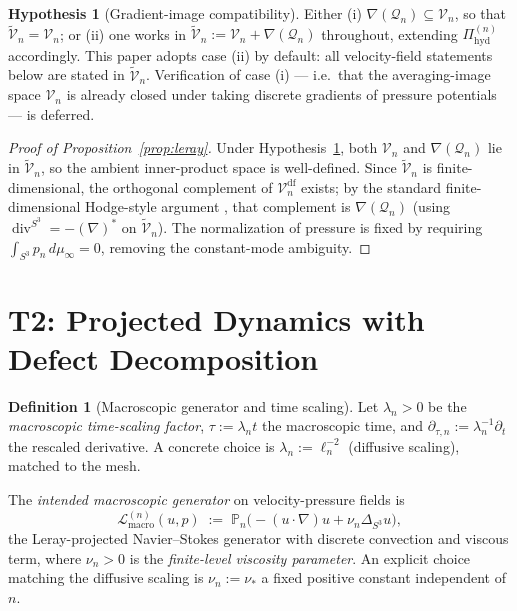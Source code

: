 \documentclass[11pt, a4paper]{amsart}
\theoremstyle{definition}
\newtheorem{definition}[theorem]{Definition}
\newtheorem{hypothesis}[theorem]{Hypothesis}
\newcommand{\Pihyd}{\Pi_{\mathrm{hyd}}}
\newcommand{\Lmacro}{\mathcal L_{\mathrm{macro}}}
\newcommand{\divS}{\operatorname{div}^{S^3}}
\newcommand{\LapS}{\Delta_{S^3}}
\newcommand{\Projn}{\mathbb P_n}
\newcommand{\Vdf}{\mathcal V_n^{\mathrm{df}}}
\begin{document}
\begin{hypothesis}[Gradient-image compatibility]\label{hyp:gradient-image}
Either (i) $\nabla(\mathcal Q_n) \subseteq \mathcal V_n$, so that
$\widetilde{\mathcal V}_n = \mathcal V_n$; or (ii) one works in
$\widetilde{\mathcal V}_n := \mathcal V_n + \nabla(\mathcal Q_n)$
throughout, extending $\Pihyd^{(n)}$ accordingly. This paper
adopts case (ii) by default: all velocity-field statements below
are stated in $\widetilde{\mathcal V}_n$. Verification of case (i)
--- i.e.\ that the averaging-image space $\mathcal V_n$ is already
closed under taking discrete gradients of pressure potentials ---
is deferred.
\end{hypothesis}

\begin{proof}[Proof of Proposition~\ref{prop:leray}]
Under Hypothesis~\ref{hyp:gradient-image}, both $\mathcal V_n$
and $\nabla(\mathcal Q_n)$ lie in $\widetilde{\mathcal V}_n$, so
the ambient inner-product space is well-defined. Since
$\widetilde{\mathcal V}_n$ is finite-dimensional, the orthogonal
complement of $\Vdf$ exists; by the standard finite-dimensional
Hodge-style argument \cite{ArnoldFalkWinther}, that complement
is $\nabla(\mathcal Q_n)$ (using $\divS = -(\nabla)^\ast$ on
$\widetilde{\mathcal V}_n$). The normalization of pressure is
fixed by requiring $\int_{S^3} p_n\,d\mu_\infty = 0$, removing
the constant-mode ambiguity.
\end{proof}

\section{T2: Projected Dynamics with Defect Decomposition}
\label{sec:projected}

\begin{definition}[Macroscopic generator and time scaling]
\label{def:Lmacro}
Let $\lambda_n > 0$ be the \emph{macroscopic time-scaling
factor}, $\tau := \lambda_n t$ the macroscopic time, and
$\partial_{\tau, n} := \lambda_n^{-1} \partial_t$ the rescaled
derivative. A concrete choice is $\lambda_n := \ell_n^{-2}$
(diffusive scaling), matched to the mesh.

The \emph{intended macroscopic generator} on velocity-pressure
fields is
\[
  \Lmacro^{(n)}(u, p) \;:=\; \Projn\bigl(-(u \cdot \nabla) u
    + \nu_n \LapS u\bigr),
\]
the Leray-projected Navier--Stokes generator with discrete
convection and viscous term, where $\nu_n > 0$ is the
\emph{finite-level viscosity parameter}. An explicit choice
matching the diffusive scaling is $\nu_n := \nu_\ast$ a fixed
positive constant independent of $n$.
\end{definition}
\end{document}
